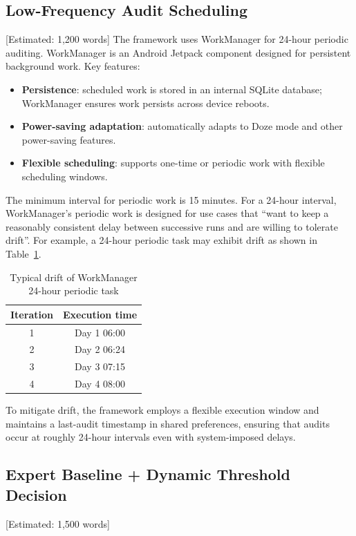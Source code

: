 \subsection{Low-Frequency Audit Scheduling} [Estimated: 1,200 words]
The framework uses WorkManager for 24-hour periodic auditing. WorkManager is an Android Jetpack component designed for persistent background work. Key features:

\begin{itemize}
\item \textbf{Persistence}: scheduled work is stored in an internal SQLite database; WorkManager ensures work persists across device reboots.
\item \textbf{Power-saving adaptation}: automatically adapts to Doze mode and other power-saving features.
\item \textbf{Flexible scheduling}: supports one-time or periodic work with flexible scheduling windows.
\end{itemize}

The minimum interval for periodic work is 15 minutes. For a 24-hour interval, WorkManager's periodic work is designed for use cases that ``want to keep a reasonably consistent delay between successive runs and are willing to tolerate drift''. For example, a 24-hour periodic task may exhibit drift as shown in Table~\ref{tab:drift}.

\begin{table}[H]
\centering
\caption{Typical drift of WorkManager 24-hour periodic task}
\begin{tabular}{c|c}
\toprule
\textbf{Iteration} & \textbf{Execution time} \\
\midrule
1 & Day 1 06:00 \\
2 & Day 2 06:24 \\
3 & Day 3 07:15 \\
4 & Day 4 08:00 \\
\bottomrule
\end{tabular}
\label{tab:drift}
\end{table}

To mitigate drift, the framework employs a flexible execution window and maintains a last-audit timestamp in shared preferences, ensuring that audits occur at roughly 24-hour intervals even with system-imposed delays.

\subsection{Expert Baseline + Dynamic Threshold Decision} [Estimated: 1,500 words]
